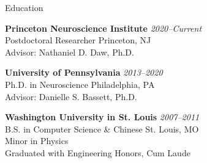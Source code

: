\documentclass{resume} %
\begin{document}

\begin{rSection}{Education}

\textbf{Princeton Neuroscience Institute} \hfill \emph{2020--Current} \\
Postdoctoral Researcher \hfill Princeton, NJ \\
Advisor: Nathaniel D. Daw, Ph.D.

\textbf{University of Pennsylvania} \hfill \emph{2013--2020} \\
Ph.D. in Neuroscience \hfill Philadelphia, PA \\
Advisor: Danielle S. Bassett, Ph.D.

\textbf{Washington University in St. Louis} \hfill \emph{2007--2011} \\
B.S. in Computer Science \& Chinese \hfill St. Louis, MO \\
Minor in Physics \\
Graduated with Engineering Honors, Cum Laude

\end{rSection}

\end{document}
